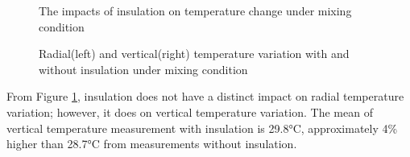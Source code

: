 \begin{figure}[h] %
    \caption*{The impacts of insulation on temperature change under mixing condition}
   \begin{minipage}{0.45\textwidth}
       \centering
   \end{minipage}
   \begin{minipage}{0.45\textwidth}
       \centering
   \end{minipage}
   \caption{Radial(left) and vertical(right) temperature variation with and without insulation under mixing condition}
	\label{fig:Mixing-InsulationComparison}
\end{figure}

From Figure \ref{fig:Mixing-InsulationComparison}, insulation does not have a distinct impact on radial temperature variation; however, it does on vertical temperature variation. The mean of vertical temperature measurement with insulation is 29.8\si{\celsius}, approximately 4\% higher than 28.7\si{\celsius} from measurements without insulation.  

